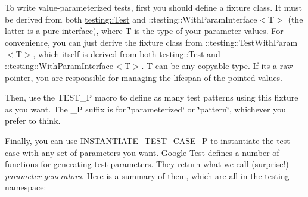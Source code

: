 To write value-\/parameterized tests, first you should define a fixture class. It must be derived from both {\ttfamily \mbox{\hyperlink{classtesting_1_1_test}{testing\+::\+Test}}} and {\ttfamily \+::testing\+::\+With\+Param\+Interface$<$T$>$} (the latter is a pure interface), where {\ttfamily T} is the type of your parameter values. For convenience, you can just derive the fixture class from {\ttfamily \+::testing\+::\+Test\+With\+Param$<$T$>$}, which itself is derived from both {\ttfamily \mbox{\hyperlink{classtesting_1_1_test}{testing\+::\+Test}}} and {\ttfamily \+::testing\+::\+With\+Param\+Interface$<$T$>$}. {\ttfamily T} can be any copyable type. If it\textquotesingle{}s a raw pointer, you are responsible for managing the lifespan of the pointed values.


\begin{DoxyCode}{0}
\DoxyCodeLine{\};}
\DoxyCodeLine{}
\DoxyCodeLine{\};}
\DoxyCodeLine{\};}
\end{DoxyCode}


Then, use the {\ttfamily T\+E\+S\+T\+\_\+P} macro to define as many test patterns using this fixture as you want. The {\ttfamily \+\_\+P} suffix is for \char`\"{}parameterized\char`\"{} or \char`\"{}pattern\char`\"{}, whichever you prefer to think.


\begin{DoxyCode}{0}
\DoxyCodeLine{\}}
\DoxyCodeLine{}
\DoxyCodeLine{\}}
\end{DoxyCode}


Finally, you can use {\ttfamily I\+N\+S\+T\+A\+N\+T\+I\+A\+T\+E\+\_\+\+T\+E\+S\+T\+\_\+\+C\+A\+S\+E\+\_\+P} to instantiate the test case with any set of parameters you want. Google Test defines a number of functions for generating test parameters. They return what we call (surprise!) {\itshape parameter generators}. Here is a summary of them, which are all in the {\ttfamily testing} namespace\+:

